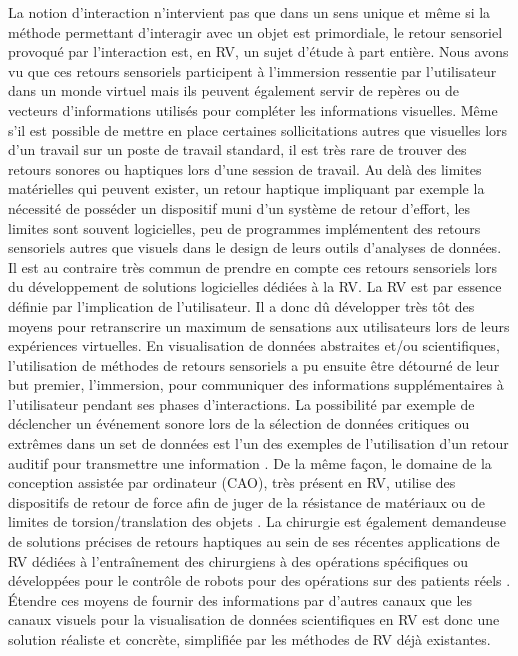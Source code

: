 La notion d'interaction n'intervient pas que dans un sens unique et même si la méthode permettant d'interagir avec un objet est primordiale, le retour sensoriel provoqué par l'interaction est, en RV, un sujet d'étude à part entière. Nous avons vu que ces retours sensoriels participent à l'immersion ressentie par l'utilisateur dans un monde virtuel mais ils peuvent également servir de repères ou de vecteurs d'informations utilisés pour compléter les informations visuelles. Même s'il est possible de mettre en place certaines sollicitations autres que visuelles lors d'un travail sur un poste de travail standard, il est très rare de trouver des retours sonores ou haptiques lors d'une session de travail. Au delà des limites matérielles qui peuvent exister, un retour haptique impliquant par exemple la nécessité de posséder un dispositif muni d'un système de retour d'effort, les limites sont souvent logicielles, peu de programmes implémentent des retours sensoriels autres que visuels dans le design de leurs outils d'analyses de données. Il est au contraire très commun de prendre en compte ces retours sensoriels lors du développement de solutions logicielles dédiées à la RV. La RV est par essence définie par l'implication de l'utilisateur. Il a donc dû développer très tôt des moyens pour retranscrire un maximum de sensations aux utilisateurs lors de leurs expériences virtuelles. En visualisation de données abstraites et/ou scientifiques, l'utilisation de méthodes de retours sensoriels a pu ensuite être détourné de leur but premier, l'immersion, pour communiquer des informations supplémentaires à l'utilisateur pendant ses phases d'interactions. La possibilité par exemple de déclencher un événement sonore lors de la sélection de données critiques ou extrêmes dans un set de données est l'un des exemples de l'utilisation d'un retour auditif pour transmettre une information \cite{ferey_multisensory_2009}. De la même façon, le domaine de la conception assistée par ordinateur (CAO), très présent en RV, utilise des dispositifs de retour de force afin de juger de la résistance de matériaux ou de limites de torsion/translation des objets \cite{sun2010haptic}. La chirurgie est également demandeuse de solutions précises de retours haptiques au sein de ses récentes applications de RV dédiées à l’entraînement des chirurgiens à des opérations spécifiques ou développées pour le contrôle de robots pour des opérations sur des patients réels \cite{kusumoto_application_2006}. Étendre ces moyens de fournir des informations par d'autres canaux que les canaux visuels pour la visualisation de données scientifiques en RV est donc une solution réaliste et concrète, simplifiée par les méthodes de RV déjà existantes.


